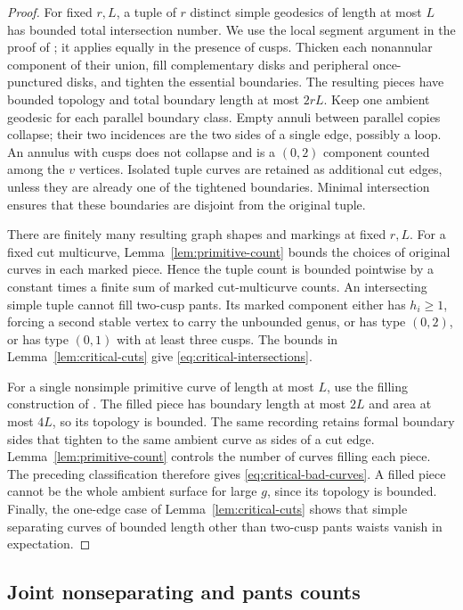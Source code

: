 \begin{proof}
For fixed $r,L$, a tuple of $r$ distinct simple geodesics of length
at most $L$ has bounded total intersection number. We use the local
segment argument in the proof of \cite[Proposition~4.5]{MP}; it
applies equally in the presence of cusps. Thicken each nonannular
component of their union, fill complementary disks and peripheral
once-punctured disks, and tighten the essential boundaries. The
resulting pieces have bounded topology and total boundary length at
most $2rL$. Keep one ambient geodesic for each parallel boundary class.
Empty annuli between parallel copies collapse; their two incidences
are the two sides of a single edge, possibly a loop. An annulus with
cusps does not collapse and is a $(0,2)$ component counted among the
$v$ vertices.
Isolated tuple curves are retained as additional cut edges, unless
they are already one of the tightened boundaries. Minimal intersection
ensures that these boundaries are disjoint from the original tuple.

There are finitely many resulting graph shapes and markings at fixed
$r,L$. For a fixed cut multicurve, Lemma~\ref{lem:primitive-count}
bounds the choices of original curves in each marked piece. Hence the
tuple count is bounded pointwise by a constant times a finite sum of
marked cut-multicurve counts. An intersecting simple tuple cannot fill
two-cusp pants. Its marked component either has $h_i\ge1$, forcing
a second stable vertex to carry the unbounded genus, or has type
$(0,2)$, or has type $(0,1)$ with at least three cusps. The bounds in
Lemma~\ref{lem:critical-cuts} give \eqref{eq:critical-intersections}.

For a single nonsimple primitive curve of length at most $L$, use
the filling construction of \cite[Definition~4.10 and Lemma~4.11]{Hide}.
The filled piece has boundary length at most $2L$ and area at most
$4L$, so its topology is bounded. The same recording retains formal
boundary sides that tighten to the same ambient curve as sides of a
cut edge. Lemma~\ref{lem:primitive-count} controls the number of curves
filling each piece. The preceding classification therefore gives
\eqref{eq:critical-bad-curves}.
A filled piece cannot be the whole ambient surface for large $g$,
since its topology is bounded. Finally, the one-edge case of
Lemma~\ref{lem:critical-cuts} shows that simple separating curves
of bounded length other than two-cusp pants waists vanish in expectation.
\end{proof}

\subsection{Joint nonseparating and pants counts}

